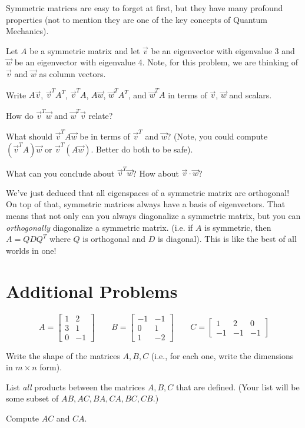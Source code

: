 \documentclass[14pt]{problemset}
\newcommand{\mat}[1]{\begin{bmatrix}#1\end{bmatrix}}
\begin{document}
	Symmetric matrices are easy to forget at first, but they have many profound 
	properties (not to mention they are one of the key concepts of Quantum Mechanics).

	\question
	Let $A$ be a symmetric matrix and let $\vec v$ be an eigenvector with eigenvalue
	3 and $\vec w$ be an eigenvector with eigenvalue 4.  Note, for this problem,
	we are thinking of $\vec v$ and $\vec w$ as column vectors.
	\begin{parts}
		\item Write $A\vec v$, $\vec v^TA^T$, $\vec v^TA$, $A\vec w$, $\vec w^TA^T$, 
		and $\vec w^TA$ in terms of $\vec v$, $\vec w$ and scalars.
		\item How do $\vec v^T\vec w$ and $\vec w^T\vec v$ relate?
		\item What should $\vec v^TA\vec w$ be in terms of $\vec v^T$ and
			$\vec w$? (Note, you could compute $(\vec v^TA)\vec w$
			or $\vec v^T(A\vec w)$.  Better do both to be safe).
		\item What can you conclude about $\vec v^T\vec w$?  How about
			$\vec v\cdot \vec w$?
	\end{parts}

	We've just deduced that all eigenspaces of a symmetric matrix are orthogonal! On
	top of that, symmetric matrices always have a basis of eigenvectors.  That means
	that not only can you always diagonalize a symmetric matrix, but you can 
	\emph{orthogonally} diagonalize a symmetric matrix. (i.e. if $A$ is symmetric,
	then $A=QDQ^T$ where $Q$ is orthogonal and $D$ is diagonal).  This is like the 
	best of all worlds in one!
























	\newpage
\section*{Additional Problems}
	\question
	\[
		A=\mat{1&2\\3&1\\0&-1}
		\qquad
		B=\mat{-1&-1\\0&1\\1&-2}
		\qquad
		C=\mat{1&2&0\\-1&-1&-1}
	\]
	\begin{parts}
		\item Write the shape of the matrices $A,B,C$ (i.e., for each one,
		write the dimensions in $m\times n$ form).
		\item List \emph{all} products between the matrices $A,B,C$ that are
		defined. (Your list will be some subset of $AB,AC,BA,CA,BC,CB$.)
		\item Compute $AC$ and $CA$.
	\end{parts}
\end{document}
